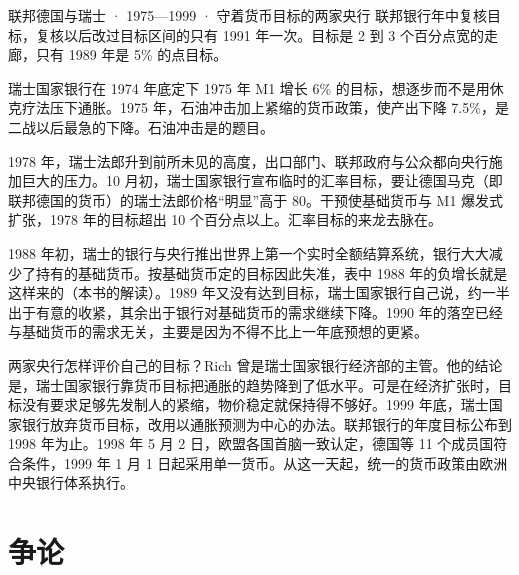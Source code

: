 \begin{case}{联邦德国与瑞士 · 1975—1999 · 守着货币目标的两家央行}
联邦银行年中复核目标，复核以后改过目标区间的只有 1991 年一次\cite{gerberding2004}。目标是 2 到 3 个百分点宽的走廊，只有 1989 年是 5\% 的点目标\cite{gerberding2004}。

瑞士国家银行在 1974 年底定下 1975 年 M1 增长 6\% 的目标，想逐步而不是用休克疗法压下通胀\cite{rich2003}。1975 年，石油冲击加上紧缩的货币政策，使产出下降 7.5\%，是二战以后最急的下降\cite{rich2003}。石油冲击是的题目。

1978 年，瑞士法郎升到前所未见的高度，出口部门、联邦政府与公众都向央行施加巨大的压力\cite{rich2003}。10 月初，瑞士国家银行宣布临时的汇率目标，要让德国马克（即联邦德国的货币）的瑞士法郎价格“明显”高于 80\cite{rich2003}。干预使基础货币与 M1 爆发式扩张，1978 年的目标超出 10 个百分点以上\cite{rich2003}。汇率目标的来龙去脉在。

1988 年初，瑞士的银行与央行推出世界上第一个实时全额结算系统，银行大大减少了持有的基础货币\cite{rich2003}。按基础货币定的目标因此失准，表中 1988 年的负增长就是这样来的（本书的解读）。1989 年又没有达到目标，瑞士国家银行自己说，约一半出于有意的收紧，其余出于银行对基础货币的需求继续下降\cite{rich2003}。1990 年的落空已经与基础货币的需求无关，主要是因为不得不比上一年底预想的更紧\cite{rich2003}。
\end{case}

两家央行怎样评价自己的目标？Rich 曾是瑞士国家银行经济部的主管\cite{rich2003}。他的结论是，瑞士国家银行靠货币目标把通胀的趋势降到了低水平\cite{rich2003}。可是在经济扩张时，目标没有要求足够先发制人的紧缩，物价稳定就保持得不够好\cite{rich2003}。1999 年底，瑞士国家银行放弃货币目标，改用以通胀预测为中心的办法\cite{rich2003}。联邦银行的年度目标公布到 1998 年为止\cite{gerberding2004}。1998 年 5 月 2 日，欧盟各国首脑一致认定，德国等 11 个成员国符合条件，1999 年 1 月 1 日起采用单一货币\cite{ecbemu}。从这一天起，统一的货币政策由欧洲中央银行体系执行\cite{ecbemu}。

\section{争论}\label{sec:monetarism-debate}

